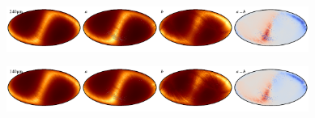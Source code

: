 \documentclass{aa}
\begin{document}
\begin{figure}
    \centering
    \includegraphics[width=0.22\textwidth]{figs/zodi/zodi_10_tot.pdf}\includegraphics[width=0.22\textwidth]{figs/zodi/zodi_10_a.pdf}\includegraphics[width=0.22\textwidth]{figs/zodi/zodi_01_b.pdf}\includegraphics[width=0.22\textwidth]{figs/zodi/zodi_10_a-b.pdf} 
    \vspace{-0.3cm}

    \includegraphics[width=0.22\textwidth]{figs/zodi/zodi_09_tot.pdf}\includegraphics[width=0.22\textwidth]{figs/zodi/zodi_09_a.pdf}\includegraphics[width=0.22\textwidth]{figs/zodi/zodi_02_b.pdf}\includegraphics[width=0.22\textwidth]{figs/zodi/zodi_09_a-b.pdf}
    \vspace{-0.3cm}


\end{figure}
\end{document}
